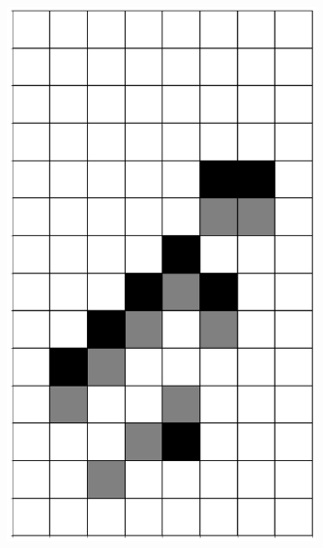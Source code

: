 \documentclass[12pt]{article}
\numberwithin{figure}{section} %
\begin{document}
\begin{figure}[H]
\begin{subfigure}{0.19\textwidth}
     \includegraphics[width=\linewidth]{Section4/17.1}
     \subcaption{}
   \end{subfigure}
        \begin{subfigure}{0.19\textwidth}
     \centering

\end{subfigure}
\end{figure}
\end{document}
